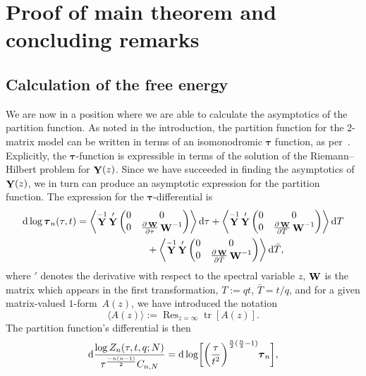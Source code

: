 \documentclass[10pt,a4paper]{amsart}
\DeclareMathOperator{\tr}{tr}
\DeclareMathOperator*{\Ress}{Res}
\newcommand{\Res}{\displaystyle\Ress}
\DeclareMathOperator{\YY}{{\bf Y}}
\DeclareMathOperator{\WW}{{\bf W}}
\numberwithin{equation}{section}
\begin{document}
\section{Proof of main theorem and concluding remarks}\label{section7}
\subsection{Calculation of the free energy}
We are now in a position where we are able to calculate the asymptotics of the partition function. As noted in the introduction, the partition function for the 2-matrix model can be written in terms of an isomonodromic $\boldsymbol{\tau}$ function, as per~\cite{Bertola-Marchal}. Explicitly,
the $\boldsymbol{\tau}$-function is expressible in terms of the solution of the Riemann--Hilbert problem for $\YY(z)$. Since we have succeeded in
finding the asymptotics of $\YY(z)$, we in turn can produce an asymptotic expression for the partition function. The expression for the $\boldsymbol{\tau}$-differential is
 \begin{gather}
 {\rm d}\log \boldsymbol{\tau}_n(\tau,t) = \left\langle \YY^{-1}\YY'
 \begin{pmatrix}
 0 & 0\\
 0 & \frac{\partial \WW} {\partial \tau} \WW^{-1}
 \end{pmatrix}\right\rangle {\rm d}\tau
 + \left\langle \YY^{-1}\YY' \begin{pmatrix}
 0 & 0\\
 0 & \frac{\partial \WW }{\partial T} \WW^{-1}
 \end{pmatrix}\right\rangle {\rm d}T \nonumber\\
 \hphantom{{\rm d}\log \boldsymbol{\tau}_n(\tau,t) = }{}
 + \left\langle \YY^{-1}\YY' \begin{pmatrix}
 0 & 0\\
 0 & \frac{\partial \WW }{\partial \bar{T}} \WW^{-1}
 \end{pmatrix}\right\rangle {\rm d}\bar{T},\label{tau-diff-1}
 \end{gather}
where $'$ denotes the derivative with respect to the spectral variable $z$, $\WW$ is the matrix which appears in the first transformation, $T := qt$, $\bar{T} = t/q$, and
for a given matrix-valued $1$-form~$A(z)$, we have introduced the notation
 \begin{equation*}
 \langle A(z) \rangle := \Res_{z=\infty} \tr \left[ A(z) \right].
 \end{equation*}
The partition function's differential is then
 \begin{equation*}
 {\rm d}\frac{\log Z_{n}(\tau,t,q;N)}{\tau^{\frac{-n(n-1)}{2}}C_{n,N}} = {\rm d}\log\biggl[\biggl(\frac{\tau}{t^2}\biggr)^{\frac{n}{2}(\frac{n}{3}-1)} \boldsymbol{\tau}_n \biggr],
 \end{equation*}
\end{document}
